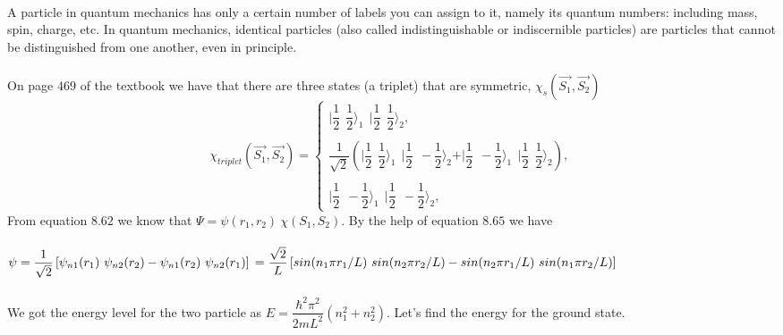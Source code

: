 \documentclass[fleqn]{article}
\begin{document}
\begin{enumerate}
      \textcolor{hwColor}{
        \\
        A particle in quantum mechanics has only a certain number of labels you can assign to it, namely its quantum numbers: 
        including mass, spin, charge, etc. In quantum mechanics, identical particles (also called indistinguishable or indiscernible 
        particles) are particles that cannot be distinguished from one another, even in principle.
        \\
        \\
        On page $469$ of the textbook we have that there are three states (a triplet) that are symmetric, $\chi_{s}\left(\overrightarrow{S_1}, \overrightarrow{S_2}\right)$
        $$
          \chi_{triplet}\left(\overrightarrow{S_1}, \overrightarrow{S_2}\right)
          =\begin{cases}
            \vert \dfrac{1}{2} ~~ \dfrac{1}{2} \rangle_1 ~~  \vert \dfrac{1}{2} ~~ \dfrac{1}{2} \rangle_2,
            \\
            \\
            \dfrac{1}{\sqrt{2}} \left(
              \vert \dfrac{1}{2} ~~ \dfrac{1}{2} \rangle_1 ~~ \vert \dfrac{1}{2} ~~ -\dfrac{1}{2} \rangle_2
              +\vert \dfrac{1}{2} ~~ -\dfrac{1}{2} \rangle_1 ~~ \vert \dfrac{1}{2} ~~ \dfrac{1}{2} \rangle_2
            \right),
            \\
            \\
            \vert \dfrac{1}{2} ~~ -\dfrac{1}{2} \rangle_1 ~~  \vert \dfrac{1}{2} ~~ -\dfrac{1}{2} \rangle_2,
          \end{cases}
        $$
        From equation $8.62$ we know that $\Psi=\psi(r_1, r_2) ~ \chi(S_1, S_2)$. By the help of equation $8.65$ we have
        \\
        \\
        $
          \psi=\dfrac{1}{\sqrt{2}} \left[
            \psi_{n1}(r_1) ~ \psi_{n2}(r_2)-\psi_{n1}(r_2) ~ \psi_{n2}(r_1)
          \right]
          \\
          \\
          =\dfrac{\sqrt{2}}{L} \left[
            sin(n_1 \pi r_1/L) ~ sin(n_2 \pi r_2/L)
            -sin(n_2 \pi r_1/L) ~ sin(n_1 \pi r_2/L)
          \right]
        $
        \\
        \\
        We got the energy level for the two particle as $E=\dfrac{\hbar^2 \pi^2}{2m L^2} \left(n^2_1+n^2_2\right)$. Let's
        find the energy for the ground state.
        \\
}
\end{enumerate}
\end{document}
